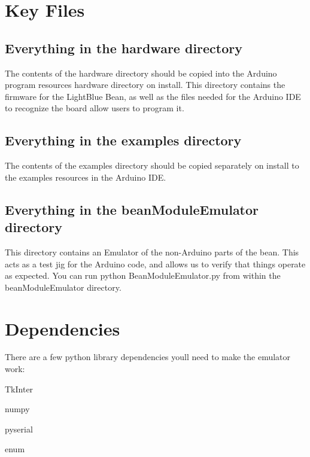 \section*{Key Files}

\subsection*{Everything in the {\ttfamily hardware} directory}

The contents of the hardware directory should be copied into the Arduino program resources hardware directory on install. This directory contains the firmware for the Light\+Blue Bean, as well as the files needed for the Arduino I\+D\+E to recognize the board allow users to program it.

\subsection*{Everything in the {\ttfamily examples} directory}

The contents of the examples directory should be copied separately on install to the examples resources in the Arduino I\+D\+E.

\subsection*{Everything in the {\ttfamily bean\+Module\+Emulator} directory}

This directory contains an Emulator of the \textquotesingle{}non-\/\+Arduino\textquotesingle{} parts of the bean. This acts as a test jig for the Arduino code, and allows us to verify that things operate as expected. You can run {\ttfamily python Bean\+Module\+Emulator.\+py} from within the bean\+Module\+Emulator directory.

\section*{Dependencies}

There are a few python library dependencies you\textquotesingle{}ll need to make the emulator work\+:


\begin{DoxyItemize}
\item Tk\+Inter
\item numpy
\item pyserial
\item enum
\end{DoxyItemize}

